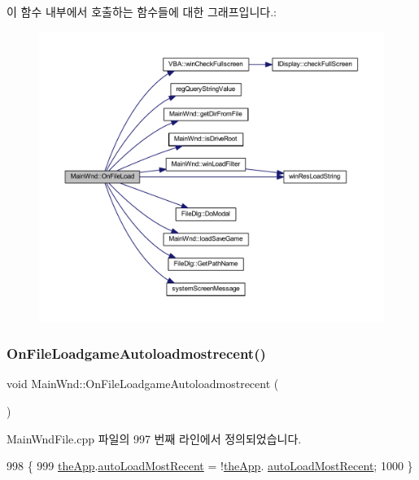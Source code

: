 이 함수 내부에서 호출하는 함수들에 대한 그래프입니다.\+:
\nopagebreak
\begin{figure}[H]
\begin{center}
\leavevmode
\includegraphics[width=350pt]{class_main_wnd_a50801b3ffe4aa323fdd654dc56e71d32_cgraph}
\end{center}
\end{figure}
\mbox{\label{class_main_wnd_af53d8941c90b605bfa148a2a74c9f178}} 
\subsubsection{\texorpdfstring{On\+File\+Loadgame\+Autoloadmostrecent()}{OnFileLoadgameAutoloadmostrecent()}}
{\footnotesize\ttfamily void Main\+Wnd\+::\+On\+File\+Loadgame\+Autoloadmostrecent (\begin{DoxyParamCaption}{ }\end{DoxyParamCaption})\hspace{0.3cm}{\ttfamily [protected]}}



Main\+Wnd\+File.\+cpp 파일의 997 번째 라인에서 정의되었습니다.


\begin{DoxyCode}
998 \{
999   \mbox{\hyperlink{_v_b_a_8cpp_a8095a9d06b37a7efe3723f3218ad8fb3}{theApp}}.\mbox{\hyperlink{class_v_b_a_aa523f068e8e2939fa2907a95f0881bde}{autoLoadMostRecent}} = !\mbox{\hyperlink{_v_b_a_8cpp_a8095a9d06b37a7efe3723f3218ad8fb3}{theApp}}.
      \mbox{\hyperlink{class_v_b_a_aa523f068e8e2939fa2907a95f0881bde}{autoLoadMostRecent}};
1000 \}
\end{DoxyCode}
\mbox{\label{class_main_wnd_aafa7776c35ba50c4244cb22650f15337}} 
